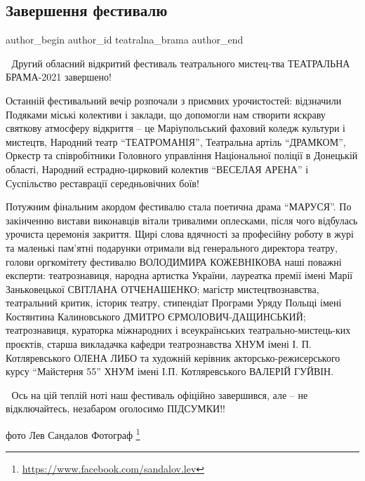  
 
 
 
 

\subsection{Завершення фестивалю}
\label{sec:20_09_2021.fb.teatralna_brama.2.zavershennja_festivalu}

\ifcmt
 author_begin
   author_id teatralna_brama
 author_end
\fi

🎊 Другий обласний відкритий фестиваль театрального мистец\hyp{}тва ТЕАТРАЛЬНА
БРАМА-2021 завершено!🎊

Останній фестивальний вечір розпочали з приємних урочистостей: відзначили
Подяками міські колективи і заклади, що допомогли нам створити яскраву святкову
атмосферу відкриття – це Маріупольський фаховий коледж культури і мистецтв,
Народний театр \enquote{ТЕАТРОМАНІЯ}, Театральна артіль \enquote{ДРАМКОМ}, Оркестр та
співробітники Головного управління Національної поліції в Донецькій області,
Народний естрадно-цирковий колектив \enquote{ВЕСЕЛАЯ АРЕНА} і Суспільство реставрації
середньовічних боїв!

Потужним фінальним акордом фестивалю стала поетична драма \enquote{МАРУСЯ}. По
закінченню вистави виконавців вітали тривалими оплесками, після чого відбулась
урочиста церемонія закриття. Щирі слова вдячності за професійну роботу в журі
та маленькі пам'ятні подарунки отримали від генерального директора театру,
голови оргкомітету фестивалю ВОЛОДИМИРА КОЖЕВНІКОВА наші поважні експерти:
театрознавиця, народна артистка України, лауреатка премії імені Марії
Заньковецької СВІТЛАНА ОТЧЕНАШЕНКО; магістр мистецтвознавства, театральний
критик, історик театру, стипендіат Програми Уряду Польщі імені Костянтина
Калиновського ДМИТРО ЄРМОЛОВИЧ-ДАЩИНСЬКИЙ; театрознавиця, кураторка міжнародних
і всеукраїнських театрально-мистець\hyp{}ких проєктів, старша викладачка кафедри
театрознавства ХНУМ імені І. П. Котляревського ОЛЕНА ЛИБО та художній керівник
акторсько-режисерського курсу \enquote{Майстерня 55} ХНУМ імені І.П. Котляревського
ВАЛЕРІЙ ГУЙВІН.

💜 Ось на цій теплій ноті наш фестиваль офіційно завершився, але – не
відключайтесь, незабаром оголосимо ПІДСУМКИ!!🤩

фото Лев Сандалов Фотограф%
\footnote{\url{https://www.facebook.com/sandalov.lev}}

